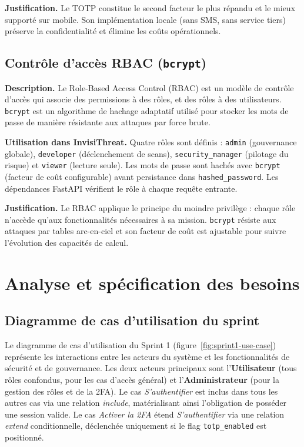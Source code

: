\textbf{Justification.} Le TOTP constitue le second facteur le plus répandu et le mieux supporté sur mobile. Son implémentation locale (sans SMS, sans service tiers) préserve la confidentialité et élimine les coûts opérationnels.

\subsection{Contrôle d'accès RBAC (\texttt{bcrypt})}

\textbf{Description.} Le Role-Based Access Control (RBAC) est un modèle de contrôle d'accès qui associe des permissions à des rôles, et des rôles à des utilisateurs. \texttt{bcrypt} est un algorithme de hachage adaptatif utilisé pour stocker les mots de passe de manière résistante aux attaques par force brute.

\textbf{Utilisation dans InvisiThreat.} Quatre rôles sont définis : \texttt{admin} (gouvernance globale), \texttt{developer} (déclenchement de scans), \texttt{security\_manager} (pilotage du risque) et \texttt{viewer} (lecture seule). Les mots de passe sont hachés avec \texttt{bcrypt} (facteur de coût configurable) avant persistance dans \texttt{hashed\_password}. Les dépendances FastAPI vérifient le rôle à chaque requête entrante.

\textbf{Justification.} Le RBAC applique le principe du moindre privilège : chaque rôle n'accède qu'aux fonctionnalités nécessaires à sa mission. \texttt{bcrypt} résiste aux attaques par tables arc-en-ciel et son facteur de coût est ajustable pour suivre l'évolution des capacités de calcul.

\section{Analyse et spécification des besoins}

\subsection{Diagramme de cas d'utilisation du sprint}

Le diagramme de cas d'utilisation du Sprint 1 (figure~\ref{fig:sprint1-use-case}) représente les interactions entre les acteurs du système et les fonctionnalités de sécurité et de gouvernance. Les deux acteurs principaux sont l'\textbf{Utilisateur} (tous rôles confondus, pour les cas d'accès général) et l'\textbf{Administrateur} (pour la gestion des rôles et de la 2FA). Le cas \textit{S'authentifier} est inclus dans tous les autres cas via une relation \textit{include}, matérialisant ainsi l'obligation de posséder une session valide. Le cas \textit{Activer la 2FA} étend \textit{S'authentifier} via une relation \textit{extend} conditionnelle, déclenchée uniquement si le flag \texttt{totp\_enabled} est positionné.

